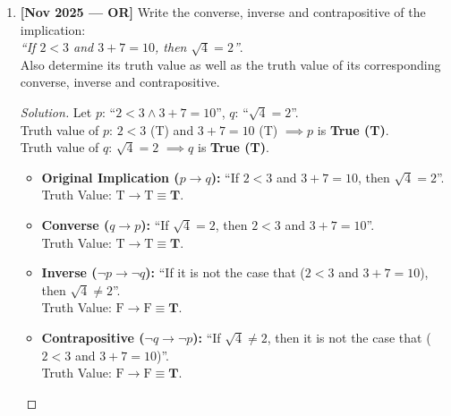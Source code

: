 \documentclass[11pt,a4paper]{article}
\newenvironment{sol}{\begin{proof}[Solution]}{\end{proof}}
\begin{document}
\begin{enumerate}[leftmargin=1.5em, label=\textbf{Q\arabic*:}]
    \item \textbf{[Nov 2025 --- OR]} Write the converse, inverse and contrapositive of the implication: \\
    \textit{``If $2 < 3$ and $3 + 7 = 10$, then $\sqrt{4} = 2$''}. \\
    Also determine its truth value as well as the truth value of its corresponding converse, inverse and contrapositive.
    \begin{sol}
    Let $p$: ``$2 < 3 \land 3 + 7 = 10$'', $q$: ``$\sqrt{4} = 2$''. \\
    Truth value of $p$: $2 < 3$ (T) and $3+7=10$ (T) $\implies p$ is \textbf{True (T)}. \\
    Truth value of $q$: $\sqrt{4} = 2$ $\implies q$ is \textbf{True (T)}. \\
    \begin{itemize}[leftmargin=1.5em]
        \item \textbf{Original Implication ($p \rightarrow q$):} ``If $2 < 3$ and $3 + 7 = 10$, then $\sqrt{4} = 2$''. \\
        Truth Value: $\text{T} \rightarrow \text{T} \equiv \mathbf{T}$.
        \item \textbf{Converse ($q \rightarrow p$):} ``If $\sqrt{4} = 2$, then $2 < 3$ and $3 + 7 = 10$''. \\
        Truth Value: $\text{T} \rightarrow \text{T} \equiv \mathbf{T}$.
        \item \textbf{Inverse ($\neg p \rightarrow \neg q$):} ``If it is not the case that ($2 < 3$ and $3 + 7 = 10$), then $\sqrt{4} \ne 2$''. \\
        Truth Value: $\text{F} \rightarrow \text{F} \equiv \mathbf{T}$.
        \item \textbf{Contrapositive ($\neg q \rightarrow \neg p$):} ``If $\sqrt{4} \ne 2$, then it is not the case that ($2 < 3$ and $3 + 7 = 10$)''. \\
        Truth Value: $\text{F} \rightarrow \text{F} \equiv \mathbf{T}$.
    \end{itemize}
    \end{sol}
    \vspace{6pt}


\end{enumerate}
\end{document}
